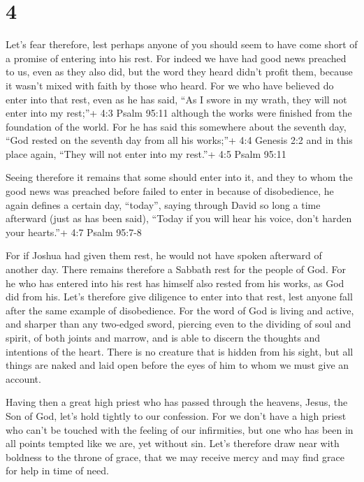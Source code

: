 \hypertarget{section-3}{%
\section{4}\label{section-3}}

 Let's fear therefore, lest perhaps anyone of you should
seem to have come short of a promise of entering into his rest.
 For indeed we have had good news preached to us, even as
they also did, but the word they heard didn't profit them, because it
wasn't mixed with faith by those who heard.  For we who have
believed do enter into that rest, even as he has said, ``As I swore in
my wrath, they will not enter into my rest;''+ 4:3 Psalm 95:11 although
the works were finished from the foundation of the world. 
For he has said this somewhere about the seventh day, ``God rested on
the seventh day from all his works;''+ 4:4 Genesis 2:2  and
in this place again, ``They will not enter into my rest.''+ 4:5 Psalm
95:11

 Seeing therefore it remains that some should enter into it,
and they to whom the good news was preached before failed to enter in
because of disobedience,  he again defines a certain day,
``today'', saying through David so long a time afterward (just as has
been said), ``Today if you will hear his voice, don't harden your
hearts.''+ 4:7 Psalm 95:7-8

 For if Joshua had given them rest, he would not have spoken
afterward of another day.  There remains therefore a Sabbath
rest for the people of God.  For he who has entered into
his rest has himself also rested from his works, as God did from his.
 Let's therefore give diligence to enter into that rest,
lest anyone fall after the same example of disobedience. 
For the word of God is living and active, and sharper than any two-edged
sword, piercing even to the dividing of soul and spirit, of both joints
and marrow, and is able to discern the thoughts and intentions of the
heart.  There is no creature that is hidden from his sight,
but all things are naked and laid open before the eyes of him to whom we
must give an account.

 Having then a great high priest who has passed through the
heavens, Jesus, the Son of God, let's hold tightly to our confession.
 For we don't have a high priest who can't be touched with
the feeling of our infirmities, but one who has been in all points
tempted like we are, yet without sin.  Let's therefore draw
near with boldness to the throne of grace, that we may receive mercy and
may find grace for help in time of need.

